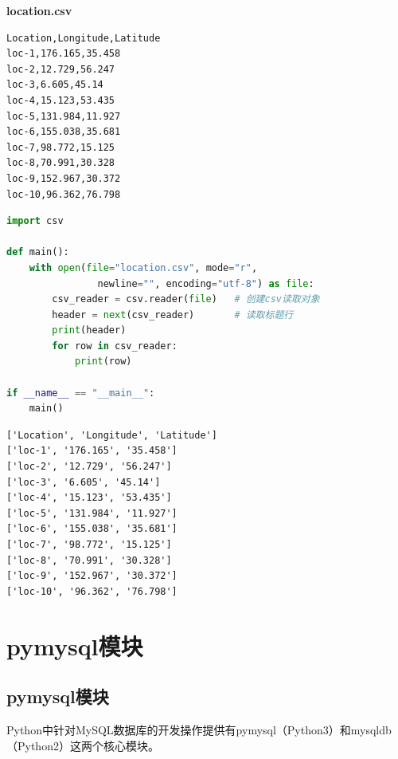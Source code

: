 \begin{tcolorbox}
	\textbf{location.csv}
	\begin{verbatim}
Location,Longitude,Latitude
loc-1,176.165,35.458
loc-2,12.729,56.247
loc-3,6.605,45.14
loc-4,15.123,53.435
loc-5,131.984,11.927
loc-6,155.038,35.681
loc-7,98.772,15.125
loc-8,70.991,30.328
loc-9,152.967,30.372
loc-10,96.362,76.798
\end{verbatim}
\end{tcolorbox}

\vspace{0.5cm}


\begin{lstlisting}[language=Python]
import csv

def main():
    with open(file="location.csv", mode="r", 
                newline="", encoding="utf-8") as file:
        csv_reader = csv.reader(file)   # 创建csv读取对象
        header = next(csv_reader)       # 读取标题行
        print(header)
        for row in csv_reader:
            print(row)

if __name__ == "__main__":
    main()
\end{lstlisting}

\begin{tcolorbox}
	\begin{verbatim}
['Location', 'Longitude', 'Latitude']
['loc-1', '176.165', '35.458']
['loc-2', '12.729', '56.247']
['loc-3', '6.605', '45.14']
['loc-4', '15.123', '53.435']
['loc-5', '131.984', '11.927']
['loc-6', '155.038', '35.681']
['loc-7', '98.772', '15.125']
['loc-8', '70.991', '30.328']
['loc-9', '152.967', '30.372']
['loc-10', '96.362', '76.798']
\end{verbatim}
\end{tcolorbox}

\newpage

\section{pymysql模块}

\subsection{pymysql模块}

Python中针对MySQL数据库的开发操作提供有pymysql（Python3）和mysqldb（Python2）这两个核心模块。\\

